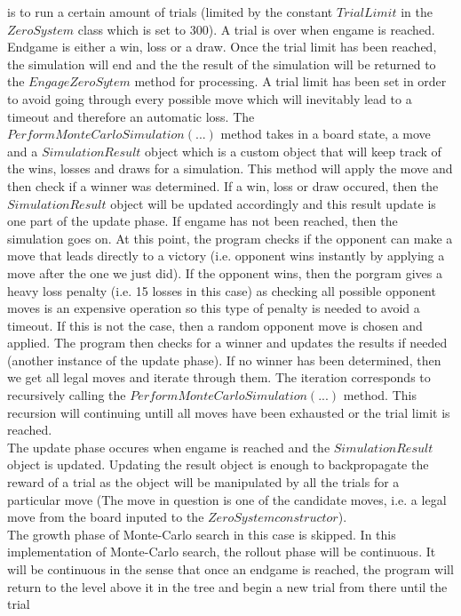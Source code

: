 \documentclass[12pt]{article} %
\begin{document}
is to run a certain amount of trials (limited by the constant $TrialLimit$ in the $ZeroSystem$ class which is set to 300). A trial is over when engame is reached. Endgame is 
either a win, loss or a draw. Once the trial limit has been reached, the simulation will end and the the result of the simulation will be returned to the $EngageZeroSytem$
method for processing. A trial limit has been set in order to avoid going through every possible move which will inevitably lead to a timeout and therefore an automatic loss.
The $PerformMonteCarloSimulation(...)$ method takes in a board state, a move and a $SimulationResult$ object which is a custom object that will keep track of the wins, losses and draws for 
a simulation. This method will apply the move and then check if a winner was determined. If a win, loss or draw occured, then the $SimulationResult$ object will be updated accordingly 
and this result update is one part of the update phase. If engame has not been reached, then the simulation goes on. At this point, the program checks if the opponent can make 
a move that leads directly to a victory (i.e. opponent wins instantly by applying a move after the one we just did). If the opponent wins, then the porgram gives a heavy loss penalty 
(i.e. 15 losses in this case) as checking all possible opponent moves is an expensive operation so this type of penalty is needed to avoid a timeout. If this is not the case,  
then a random opponent move is chosen and applied. The program then checks for a winner and updates the results if needed (another instance of the update phase).
If no winner has been determined, then we get all legal moves and iterate through them. The iteration corresponds to recursively calling the $PerformMonteCarloSimulation(...)$ 
method. This recursion will continuing untill all moves have been exhausted or the trial limit is reached.
\\The update phase occures when engame is reached and the $SimulationResult$ object is updated. Updating the result object is enough to backpropagate the reward of a trial 
as the object will be manipulated by all the trials for a particular move (The move in question is one of the candidate moves, i.e. a legal move from the board inputed 
to the $ZeroSystem constructor$).
\\ The growth phase of Monte-Carlo search in this case is skipped. In this implementation of Monte-Carlo search, the rollout phase will be continuous. It will
be continuous in the sense that once an endgame is reached, the program will return to the level above it in the tree and begin a new trial from there until the trial 
\end{document}
